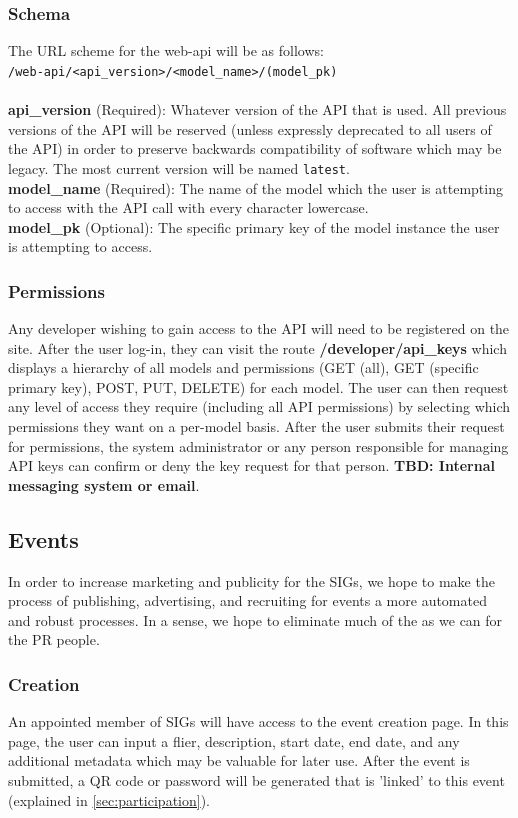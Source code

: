 \documentclass{article}
\begin{document}
\subsubsection{Schema}
The URL scheme for the web-api will be as follows:
\\ \texttt{/web-api/<api\_version>/<model\_name>/(model\_pk)}
\\
\\
\textbf{api\_version} (Required): Whatever version of the API that is used. All
previous versions of the API will be reserved (unless expressly deprecated to
all users of the API) in order to preserve backwards compatibility of software
which may be legacy. The most current version will be named \texttt{latest}.
\\
\textbf{model\_name} (Required): The name of the model which the user is
attempting to access with the API call with every character lowercase.
\\
\textbf{model\_pk} (Optional): The specific primary key of the model instance
the user is attempting to access. %

\subsubsection{Permissions}
Any developer wishing to gain access to the API will need to be registered on
the site. After the user log-in, they can visit the route
\textbf{/developer/api\_keys} which displays a hierarchy of all models and
permissions (GET (all), GET (specific primary key), POST, PUT, DELETE) for each
model. The user can then request any level of access they require (including
all API permissions) by selecting which permissions they want on a per-model
basis. After the user submits their request for permissions, the system
administrator or any person responsible for managing API keys can confirm or
deny the key request for that person. \textbf{TBD: Internal messaging system or
email}. %

\subsection{Events}
In order to increase marketing and publicity for the SIGs, we hope to make the
process of publishing, advertising, and recruiting for events a more automated
and robust processes. In a sense, we hope to eliminate much of the as we can
for the PR people.

\subsubsection{Creation}
An appointed member of SIGs will have access to the event creation page. In
this page, the user can input a flier, description, start date, end date, and any
additional metadata which may be valuable for later use. After the event is submitted,
a QR code or password will be generated that is 'linked' to this event (explained
in \ref{sec:participation}).
\end{document}
